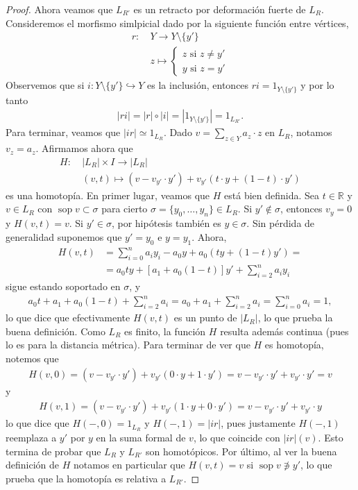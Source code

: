 \documentclass[11pt]{article}
\newcommand{\R}{\mathbb{R}}
\begin{document}
\begin{proof}
Ahora veamos que $L_{R'}$ es un retracto por deformaci\'on fuerte de $L_R$. Consideremos el morfismo simlpicial dado por la siguiente funci\'on entre v\'ertices,
\begin{align*}
r : \ &Y \to Y \setminus \{y'\}\\ 
& z \mapsto \begin{cases}
z \text{ si $z \neq y'$}\\
y \text{ si $z = y'$}
\end{cases}
\end{align*}
Observemos que si $i : Y \setminus \{y'\} \hookrightarrow Y$ es la inclusi\'on, entonces $ri = 1_{Y \setminus \{y'\}}$ y por lo tanto
\begin{align*}
|ri| = |r| \circ |i| = |1_{Y \setminus \{y'\}}| = 1_{L_{R'}}.
\end{align*}
Para terminar, veamos que $|ir| \simeq 1_{L_R}$. Dado $v = \sum_{z \in Y}a_z \cdot z$ en $L_{R}$, notamos $v_z = a_z$. Afirmamos ahora que
\begin{align*}
H : \ &|L_R| \times I \longrightarrow |L_R|\\
& (v,t) \mapsto (v - v_{y'} \cdot y') + v_{y'}(t \cdot y + (1-t) \cdot y')
\end{align*}
es una homotop\'ia. En primer lugar, veamos que $H$ est\'a bien definida. Sea $t \in \R$ y $v \in L_R$ con $\operatorname{sop} v \subset \sigma$ para cierto $ \sigma = \{y_0, \dots, y_n\} \in L_R$.
Si $y' \not \in \sigma$, entonces $v_y = 0$ y $H(v,t) = v$. Si $y' \in \sigma$, por hip\'otesis tambi\'en es $y \in \sigma$. Sin p\'erdida de generalidad suponemos que $y' = y_0$ e $y = y_1$. Ahora, 
\begin{align*}
H(v,t) &= \sum_{i=0}^na_iy_i - a_0y + a_0(ty + (1-t)y') = \\
& = a_0ty + [a_1 + a_0(1-t)]y' + \sum_{i=2}^na_iy_i
\end{align*}
sigue estando soportado en $\sigma$, y 
\begin{align*}
a_0t + a_1 + a_0(1-t) + \sum_{i=2}^na_i = a_0 + a_1 + \sum_{i=2}^na_i = \sum_{i=0}^na_i = 1,
\end{align*}
lo que dice que efectivamente $H(v,t)$ es un punto de $|L_R|$, lo que prueba la buena definici\'on. Como $L_R$ es finito, la funci\'on $H$ resulta adem\'as continua (pues lo es para la distancia m\'etrica). Para terminar de ver que $H$ es homotop\'ia, notemos que
\begin{align*}
H(v,0) = (v - v_{y'} \cdot y') + v_{y'}(0 \cdot y + 1 \cdot y') = v - v_{y'} \cdot y' + v_{y'} \cdot y' = v
\end{align*}
y
\begin{align*}
H(v,1) = (v - v_{y'} \cdot y') + v_{y'}(1 \cdot y + 0\cdot y') = v - v_{y'} \cdot y' + v_{y'} \cdot y 
\end{align*}
lo que dice que $H(-,0) = 1_{L_R}$ y $H(-,1) = |ir|$, pues justamente $H(-,1)$ reemplaza a $y'$ por $y$ en la suma formal de $v$, lo que coincide con $|ir|(v)$. Esto termina de probar que $L_R$ y $L_{R'}$ son homot\'opicos. Por \'ultimo, al ver la buena definici\'on de $H$ notamos en particular que $H(v,t) = v$ si $\operatorname{sop} v \not \ni y'$, lo que prueba que la homotop\'ia es relativa a $L_{R'}$. 
\end{proof}
\end{document}

